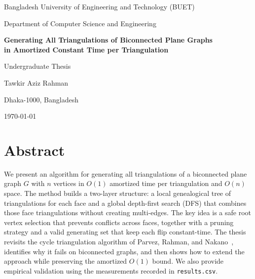 \documentclass[12pt,a4paper]{report}
\theoremstyle{definition}
\theoremstyle{remark}
\newcommand{\Graph}{G}
\begin{document}
\begin{titlepage}
    \centering
    {\Large Bangladesh University of Engineering and Technology (BUET)\par}
    \vspace{1.0cm}
    {\LARGE Department of Computer Science and Engineering\par}
    \vspace{1.5cm}
    {\LARGE \textbf{Generating All Triangulations of Biconnected Plane Graphs\\[4pt]
                     in Amortized Constant Time per Triangulation}\par}
    \vspace{1.5cm}
    {\large Undergraduate Thesis\par}
    \vspace{1.5cm}
    {\large Tawkir Aziz Rahman\par}
    \vspace{0.5cm}
    {\large Dhaka-1000, Bangladesh\par}
    \vfill
    {\large \today\par}
\end{titlepage}


\chapter*{Abstract}

We present an algorithm for generating all triangulations of a biconnected plane graph
$\Graph$ with $n$ vertices in $O(1)$ amortized time per triangulation and $O(n)$ space.
The method builds a two-layer structure: a local genealogical tree of triangulations for
each face and a global depth-first search (DFS) that combines those face triangulations
without creating multi-edges. The key idea is a safe root vertex selection that prevents
conflicts across faces, together with a pruning strategy and a valid generating set that
keep each flip constant-time. The thesis revisits the cycle triangulation algorithm of
Parvez, Rahman, and Nakano~\cite{parvez2011}, identifies why it fails on biconnected
graphs, and then shows how to extend the approach while preserving the amortized $O(1)$
bound. We also provide empirical validation using the measurements recorded in
\texttt{results.csv}.
\end{document}
